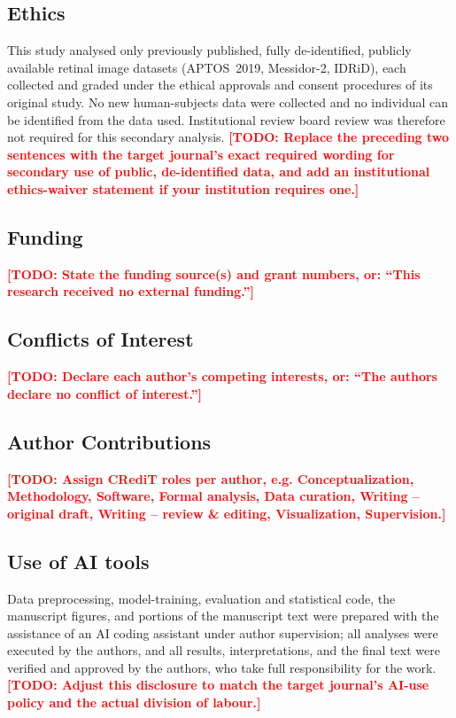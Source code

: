\documentclass[11pt,a4paper]{article}
\newcommand{\todo}[1]{\textcolor{red}{\textbf{[TODO: #1]}}}
\begin{document}
\subsection*{Ethics}
This study analysed only previously published, fully de-identified, publicly
available retinal image datasets (APTOS~2019, Messidor-2, IDRiD), each collected
and graded under the ethical approvals and consent procedures of its original
study. No new human-subjects data were collected and no individual can be
identified from the data used. Institutional review board review was therefore
not required for this secondary analysis.
\todo{Replace the preceding two sentences with the target journal's exact
required wording for secondary use of public, de-identified data, and add an
institutional ethics-waiver statement if your institution requires one.}

\subsection*{Funding}
\todo{State the funding source(s) and grant numbers, or: ``This research received
no external funding.''}

\subsection*{Conflicts of Interest}
\todo{Declare each author's competing interests, or: ``The authors declare no
conflict of interest.''}

\subsection*{Author Contributions}
\todo{Assign CRediT roles per author, e.g. Conceptualization, Methodology,
Software, Formal analysis, Data curation, Writing -- original draft, Writing --
review \& editing, Visualization, Supervision.}

\subsection*{Use of AI tools}
Data preprocessing, model-training, evaluation and statistical code, the
manuscript figures, and portions of the manuscript text were prepared with the
assistance of an AI coding assistant under author supervision; all analyses were
executed by the authors, and all results, interpretations, and the final text
were verified and approved by the authors, who take full responsibility for the
work. \todo{Adjust this disclosure to match the target journal's AI-use policy
and the actual division of labour.}



\end{document}
